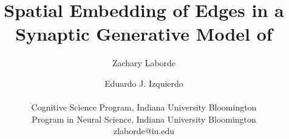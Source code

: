 \title{Spatial Embedding of Edges in a Synaptic Generative Model of \ce}

\author{Zachary Laborde \and Eduardo J. Izquierdo \\
\mbox{} \\
Cognitive Science Program, Indiana University Bloomington\\
Program in Neural Science, Indiana University Bloomington\\
zlaborde@iu.edu}
